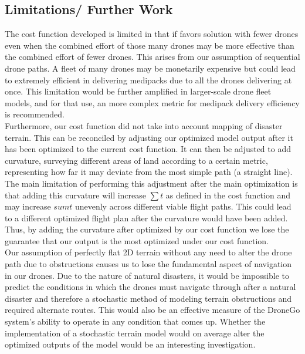 \documentclass[twocolumn,10pt]{asme2ej}
\begin{document}
\subsection{Limitations/ Further Work}
The cost function developed is limited in that if favors solution with fewer drones even when the combined effort of those many drones may be more effective than the combined effort of fewer drones. This arises from our assumption of sequential drone paths. A fleet of many drones may be monetarily expensive but could lead to extremely efficient in delivering medipacks due to all the drones delivering at once. This limitation would be further amplified in larger-scale drone fleet models, and for that use, an more complex metric for medipack delivery efficiency is recommended. \\
Furthermore, our cost function did not take into account mapping of disaster terrain. This can be reconciled by adjusting our optimized model output after it has been optimized to the current cost function. It can then be adjusted to add curvature, surveying different areas of land according to a certain metric, representing how far it may deviate from the most simple path (a straight line). The main limitation of performing this adjustment after the main optimization is that adding this curvature will increase $\sum{t}$ as defined in the cost function and may increase $sum{t}$ unevenly across different viable flight paths. This could lead to a different optimized flight plan after the curvature would have been added. Thus, by adding the curvature after optimized by our cost function we lose the guarantee that our output is the most optimized under our cost function. \\
Our assumption of perfectly flat 2D terrain without any need to alter the drone path due to obstructions causes us to lose the fundamental aspect of navigation in our drones. Due to the nature of natural disasters, it would be impossible to predict the conditions in which the drones must navigate through after a natural disaster and therefore a stochastic method of modeling terrain obstructions and required alternate routes. This would also be an effective measure of the DroneGo system's ability to operate in any condition that comes up. Whether the implementation of a stochastic terrain model would on average alter the optimized outputs of the model would be an interesting investigation. \\




\end{document}
